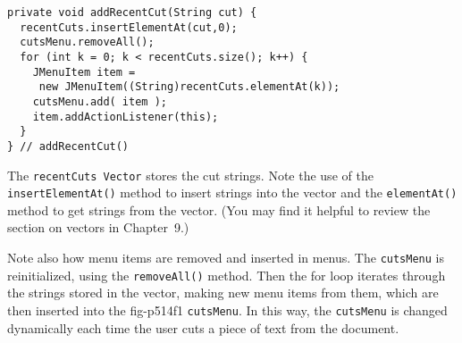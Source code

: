 \begin{jjjlisting}
\begin{lstlisting}
private void addRecentCut(String cut) {
  recentCuts.insertElementAt(cut,0);
  cutsMenu.removeAll();
  for (int k = 0; k < recentCuts.size(); k++) {
    JMenuItem item = 
     new JMenuItem((String)recentCuts.elementAt(k));
    cutsMenu.add( item );
    item.addActionListener(this);
  }
} // addRecentCut()
\end{lstlisting}
\end{jjjlisting}

\noindent The {\tt recentCuts Vector} stores the cut strings. Note
the use of the {\tt insert\-ElementAt()} method to insert strings into the
vector and the {\tt elementAt()} method to get strings from the
vector. (You may find it helpful to review the section on vectors in Chapter~9.)

Note also how menu items are removed and inserted in menus.  The
{\tt cutsMenu} is reinitialized, using the {\tt removeAll()} method.  Then
the for loop iterates through the strings stored in the vector, making
new menu items from them, which are then inserted into the
{fig-p514f1}
{\tt cutsMenu}.  In this way, the {\tt cutsMenu} is changed dynamically
each time the user cuts a piece of text from the document.

